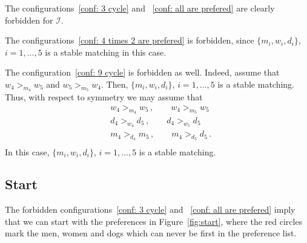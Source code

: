 \documentclass[3p,times]{amsart}
\begin{document}
\smallskip

The configurations~\ref{conf: 3 cycle} and ~\ref{conf: all are prefered} are clearly forbidden for $\mathcal{I}$.

\smallskip

The configurations~\ref{conf: 4 times 2 are prefered} is forbidden, since $\{m_i,w_i, d_i\}$, $i=1,\ldots,5$ is a stable matching in this case.

\smallskip

The configuration~\ref{conf: 9 cycle} is forbidden as well. Indeed, assume that $w_4>_{m_4} w_5$ and $w_5>_{m_5} w_4$. Then, $\{m_i,w_i, d_i\}$, $i=1,\ldots,5$ is a stable matching. Thus, with respect to symmetry we may assume that
\begin{align*}
	&w_4>_{m_4} w_5\,,\qquad w_4>_{m_5} w_5\\
	&d_4>_{w_4} d_5\,,\qquad d_4>_{w_5} d_5\\
	&m_4>_{d_4} m_5\,,\qquad m_4>_{d_5} d_5\,.\\
\end{align*}
In this case, $\{m_i,w_i, d_i\}$, $i=1,\ldots,5$ is a stable matching. 

\bigskip
\subsection{Start}
The forbidden configurations~\ref{conf: 3 cycle} and ~\ref{conf: all are prefered} imply that we can start with the preferences in Figure~\ref{fig:start}, where the red circles mark the men, women and dogs which can never be first in the preference list.
\end{document}
